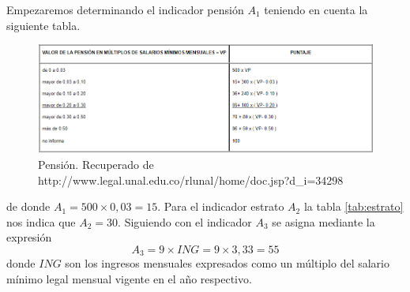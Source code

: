 \documentclass[
  11pt,
]{book}
\begin{document}
Empezaremos determinando el indicador pensión \(A_1\) teniendo en cuenta la siguiente tabla.

\begin{figure}
 
 {\centering \includegraphics[width=1\linewidth]{ProtectoR/pension} 
 
 }
 
 \caption{Pensión. Recuperado de http://www.legal.unal.edu.co/rlunal/home/doc.jsp?d_i=34298}\label{fig:unnamed-chunk-21}
 \end{figure}

de donde \(A_1=500\times 0,03=15\). Para el indicador estrato \(A_2\) la tabla \ref{tab:estrato} nos indica que \(A_2=30\). Siguiendo con el indicador \(A_3\) se asigna mediante la expresión
\[ A_3=9\times ING=9\times 3,33=55\]
donde \(ING\) son los ingresos mensuales expresados como un múltiplo del salario mínimo legal mensual vigente en el año respectivo.
\end{document}
